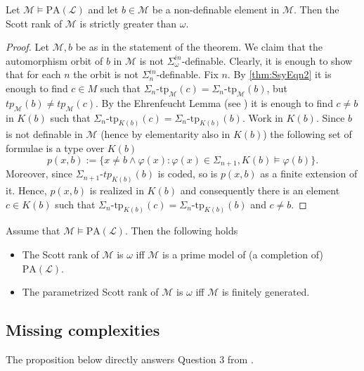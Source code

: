 \documentclass[11pt]{amsart}
\newcommand{\mc}[1]{\mathcal{#1}}
\newcommand{\PA}{\mathrm{PA}}
\newcommand{\tp}{\mathrm{tp}}
\renewcommand{\phi}{\varphi}
\theoremstyle{remark}
\begin{document}
\begin{theorem}\label{thm_srundefinMOPA}
    Let $\mathcal{M}\models \PA(\mathcal{L})$ and let $b\in \mathcal{M}$ be a non-definable element in $\mathcal{M}$. Then the Scott rank of $\mathcal{M}$ is strictly greater than $\omega$.
\end{theorem}
\begin{proof}
    Let $\mc{M},b$ be as in the statement of the theorem. We claim that the automorphism orbit of $b$ in $\mc{M}$ is not $\Sigma^{in}_{\omega}$-definable. Clearly, it is enough to show that for each $n$ the orbit is not $\Sigma_n^{in}$-definable. Fix $n$. By \cref{thm:SsyEqn2} it is enough to find $c\in M$ such that $\Sigma_{n}\text{-}\tp_{\mc{M}}(c) = \Sigma_n\text{-}\tp_{\mc{M}}(b)$, but $tp_{\mc{M}}(b)\neq tp_{\mc{M}}(c)$. By the Ehrenfeucht Lemma (see \cite[Theorem 1.7.2]{KS}) it is enough to find $c\neq b$ in $K(b)$ such that $\Sigma_{n}\text{-}\tp_{K(b)}(c) = \Sigma_n\text{-}\tp_{K(b)}(b)$. Work in $K(b)$. Since $b$ is not definable in $\mc{M}$ (hence by elementarity also in $K(b)$) the following set of formulae is a type over $K(b)$
    \[p(x,b):=\{x\neq b \wedge \phi(x):\phi(x)\in\Sigma_{n+1}, K(b)\models \phi(b)\}.\]
    Moreover, since $\Sigma_{n+1}\text{-} tp_{K(b)}(b)$ is coded, so is $p(x,b)$ as a finite extension of it. Hence, $p(x,b)$ is realized in $K(b)$ and consequently there is an element $c\in K(b)$ such that $\Sigma_{n}\text{-}\tp_{K(b)}(c) = \Sigma_n\text{-}\tp_{K(b)}(b)$ and $c\neq b$. %
\end{proof}


\begin{corollary}\label{cor:prime}
    Assume that $\mc{M}\models \PA(\mc{L})$. Then the following holds
    \begin{itemize}
        \item The Scott rank of $\mc{M}$ is $\omega$ iff $\mc{M}$ is a prime model of (a completion of) $\PA(\mc{L})$.
        \item The parametrized Scott rank of $\mc{M}$ is $\omega$ iff $\mc{M}$ is finitely generated.
    \end{itemize}
\end{corollary}

\subsection{Missing complexities}

The proposition below directly answers Question 3 from \cite{MR23}.
\end{document}
